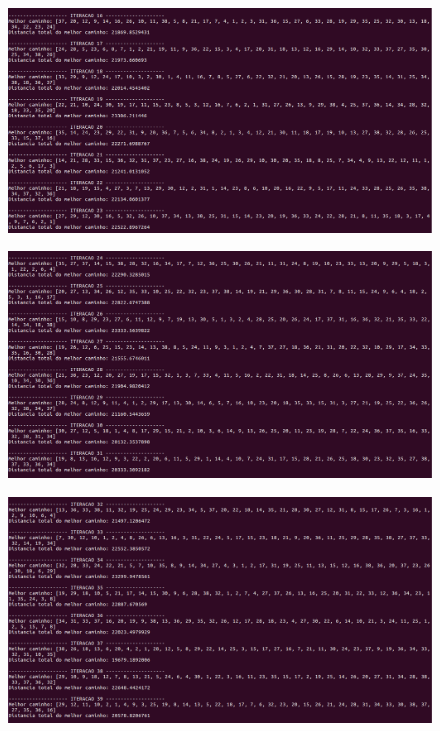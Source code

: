 \documentclass[hidelinks,12pt]{article}
\begin{document}
		\begin{figure}[!h]
			\centering
			\includegraphics[scale=0.3]{Figures/m38-1-3.png}
		\end{figure}

		\newpage

		\begin{figure}[!h]
			\centering
			\includegraphics[scale=0.3]{Figures/m38-1-4.png}
		\end{figure}

		\newpage

		\begin{figure}[!h]
			\centering
			\includegraphics[scale=0.3]{Figures/m38-1-5.png}
		\end{figure}
\end{document}
